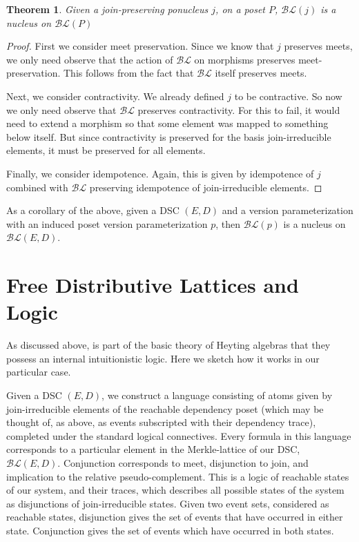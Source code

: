 \documentclass[hoptionsi,review,format=acmsmall]{acmart}
\newtheorem{theorem}{Theorem}[section]
\theoremstyle{definition}
\newcommand{\BLc}{\mathcal{BL}}
\begin{document}
\begin{theorem}
Given a join-preserving ponucleus \(j\), on a poset \(P\),  \(\BLc(j)\) is a nucleus on \(\BLc(P)\)
\end{theorem}
\begin{proof}
First we consider meet preservation. Since we know that \(j\) preserves meets, we only need observe that the action of \(\BLc\) on morphisms preserves meet-preservation. This follows from the fact that \(\BLc\) itself preserves meets.


Next, we consider contractivity. We already defined \(j\) to be contractive. So now we only need observe that \(\BLc\) preserves contractivity. For this to fail, it would need to extend a morphism so that some element was mapped to something below itself. But since contractivity is preserved for the basis join-irreducible elements, it must be preserved for all elements.

Finally, we consider idempotence. Again, this is given by idempotence of \(j\) combined with \(\BLc\) preserving idempotence of join-irreducible elements.
\end{proof}

As a corollary of the above, given a DSC \((E,D)\) and a version parameterization with an induced poset version parameterization \(p\), then \(\BLc(p)\) is a nucleus on \(\BLc(E,D)\).


\section{Free Distributive Lattices and Logic}
As discussed above, is part of the basic theory of Heyting algebras that they possess an internal intuitionistic logic. Here we sketch how it works in our particular case.

Given a DSC \((E,D)\), we construct a language consisting of atoms given by join-irreducible elements of the reachable dependency poset (which may be thought of, as above, as events subscripted with their dependency trace), completed under the standard logical connectives. Every formula in this language corresponds to a particular element in the Merkle-lattice of our DSC, \(\BLc(E,D)\).  Conjunction corresponds to meet, disjunction to join, and implication to the relative pseudo-complement. This is a logic of reachable states of our system, and their traces, which describes all possible states of the system as disjunctions of join-irreducible states. Given two event sets, considered as reachable states, disjunction gives the set of events that have occurred in either state. Conjunction gives the set of events which have occurred in both states.
\end{document}
